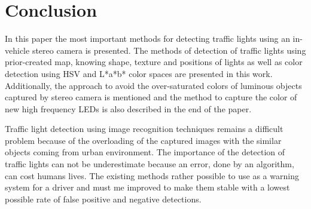 \documentclass[letterpaper, 10 pt, conference]{ieeeconf} %
\begin{document}

\section{Conclusion}
In this paper the most important methods for detecting traffic lights using an in-vehicle stereo camera is presented. The methods of detection of traffic lights using prior-created map, knowing shape, texture and positions of lights as well as color detection using HSV and L*a*b* color spaces are presented in this work. Additionally, the approach to avoid the over-saturated colors of luminous objects captured by stereo camera is mentioned and the method to capture the color of new high frequency LEDs is also described in the end of the paper.

Traffic light detection using image recognition techniques remains a difficult problem because of the overloading of the captured images with the similar objects coming from urban environment. The importance of the detection of traffic lights can not be underestimate because an error, done by an algorithm, can cost humans lives. The existing methods rather possible to use as a warning system for a driver and must me improved to make them stable with a lowest possible rate of false positive and negative detections. 

\addtolength{\textheight}{-12cm} %


\end{document}
